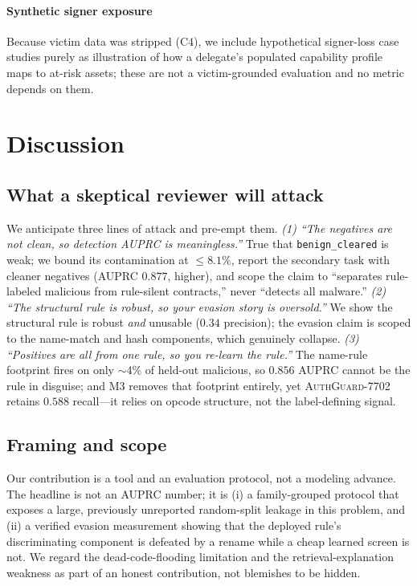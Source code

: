 \documentclass[conference]{IEEEtran}
\newcommand{\tool}{\textsc{AuthGuard-7702}}
\newcommand{\code}[1]{\texttt{#1}}
\begin{document}
\paragraph{Synthetic signer exposure} Because victim data was stripped (C4), we include
hypothetical signer-loss case studies purely as illustration of how a delegate's populated
capability profile maps to at-risk assets; these are not a victim-grounded evaluation and no
metric depends on them.

\section{Discussion}
\label{sec:discussion}

\subsection{What a skeptical reviewer will attack}
We anticipate three lines of attack and pre-empt them.
\emph{(1) ``The negatives are not clean, so detection AUPRC is meaningless.''} True that
\code{benign\_cleared} is weak; we bound its contamination at $\le 8.1\%$, report the secondary
task with cleaner negatives (AUPRC $0.877$, higher), and scope the claim to ``separates
rule-labeled malicious from rule-silent contracts,'' never ``detects all malware.''
\emph{(2) ``The structural rule is robust, so your evasion story is oversold.''} We show the
structural rule is robust \emph{and} unusable ($0.34$ precision); the evasion claim is scoped to
the name-match and hash components, which genuinely collapse.
\emph{(3) ``Positives are all from one rule, so you re-learn the rule.''} The name-rule footprint
fires on only $\sim$4\% of held-out malicious, so $0.856$ AUPRC cannot be the rule in disguise;
and M3 removes that footprint entirely, yet \tool{} retains $0.588$ recall---it relies on opcode
structure, not the label-defining signal.

\subsection{Framing and scope}
Our contribution is a tool and an evaluation protocol, not a modeling advance. The headline is
not an AUPRC number; it is (i) a family-grouped protocol that exposes a large, previously
unreported random-split leakage in this problem, and (ii) a verified evasion measurement showing
that the deployed rule's discriminating component is defeated by a rename while a cheap learned
screen is not. We regard the dead-code-flooding limitation and the retrieval-explanation weakness
as part of an honest contribution, not blemishes to be hidden.
\end{document}
